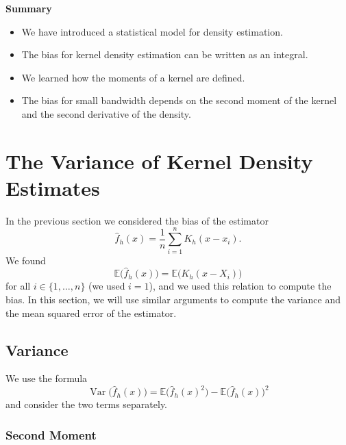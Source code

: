 \documentclass[
  a4paper,
]{article}
\providecommand{\tightlist}{%
  \setlength{\itemsep}{0pt}\setlength{\parskip}{0pt}}
\theoremstyle{definition}
\theoremstyle{definition}
\theoremstyle{definition}
\theoremstyle{definition}
\theoremstyle{remark}
\begin{document}
\textbf{Summary}

\begin{itemize}
\tightlist
\item
  We have introduced a statistical model for density estimation.
\item
  The bias for kernel density estimation can be written as an integral.
\item
  We learned how the moments of a kernel are defined.
\item
  The bias for small bandwidth depends on the second moment of the
  kernel and the second derivative of the density.
\end{itemize}

\clearpage

\section{The Variance of Kernel Density Estimates}\label{X03-Var}

In the previous section we considered the bias of the estimator
\begin{equation*}
  \hat f_h(x)
  = \frac{1}{n} \sum_{i=1}^n K_h(x - x_i).
\end{equation*}
We found
\begin{equation}
  \mathbb{E}\bigl( \hat f_h(x) \bigr)
  = \mathbb{E}\bigl( K_h(x - X_i) \bigr)  \label{eq:E-hat-f-K-h}
\end{equation}
for all \(i \in \{1, \ldots, n\}\) (we used \(i=1\)), and we used this relation
to compute the bias. In this section, we will use similar arguments to compute
the variance and the mean squared error of the estimator.

\subsection{Variance}\label{variance}

We use the formula
\begin{equation*}
  \mathop{\mathrm{Var}}\bigl( \hat f_h(x) \bigr)
  = \mathbb{E}\bigl( \hat f_h(x)^2 \bigr) - \mathbb{E}\bigl( \hat f_h(x) \bigr)^2
\end{equation*}
and consider the two terms separately.

\subsubsection{Second Moment}\label{second-moment}
\end{document}
